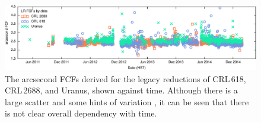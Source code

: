 \documentclass[twocolumn,times]{aastex6}
\begin{document}
\begin{figure}
\includegraphics{legacyFCF-vs-date.pdf}
\caption{The arcsecond FCFs derived for the legacy reductions of CRL\,618,
  CRL\,2688, and Uranus, shown against time. Although there is a
  large scatter and some hints of variation , it can be seen that there is not
  clear overall dependency with time.\label{fig:calibvstime}}
\end{figure}
\end{document}
